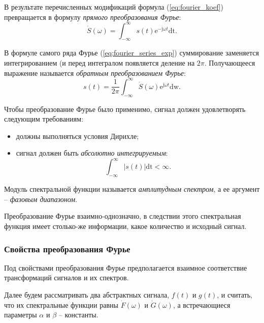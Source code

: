 \documentclass[12pt,a4paper]{article}
\begin{document}
В результате перечисленных модификаций формула (\ref{eq:fourier_koef}) превращается в формулу \emph{прямого преобразования Фурье}:
\begin{equation}
\dot{S}\left(\omega\right)=\int_{-\infty}^\infty s\left(t\right)\mathrm{e}^{-\mathrm{j}\omega t}\mathrm{dt}.
\end{equation}

В формуле самого ряда Фурье (\ref{eq:fourier_series_exp}) суммирование заменяется интегрированием (и перед интегралом появляется деление на $2\pi$. Получающееся выражение называется \emph{обратным преобразованием Фурье}:
\begin{equation}
s\left(t\right)=\frac{1}{2\pi}\int_{-\infty}^{\infty}\dot{S}\left(\omega\right)\mathrm{e}^{\mathrm{j}\omega t}\mathrm{dw}.
\end{equation}

Чтобы преобразование Фурье было применимо, сигнал должен удовлетворять следующим требованиям:
\begin{itemize}
\item должны выполняться условия Дирихле;
\item сигнал должен быть \emph{абсолютно интегрируемым}:
\begin{equation}
\nonumber
\int_{-\infty}^{\infty}|s\left(t\right)|\mathrm{dt} < \infty.
\end{equation}
\end{itemize}

Модуль спектральной функции называется \emph{амплитудным спектром}, а ее аргумент -- \emph{фазовым диапазоном}.

Преобразование Фурье взаимно-однозначно, в следствии этого спектральная функция имеет столько-же информации, какое количество и исходный сигнал.

\subsubsection{Свойства преобразования Фурье}

Под свойствами преобразования Фурье предполагается взаимное соответствие трансформаций сигналов и их спектров.


Далее будем рассматривать два абстрактных сигнала, $f\left(t\right)$ и $g\left(t\right)$, и считать, что их спектральные функции равны $\dot{F}\left(\omega\right)$ и $\dot{G}\left(\omega\right)$, а встречающиеся параметры $\alpha$ и $\beta$ -- константы.
\end{document}
